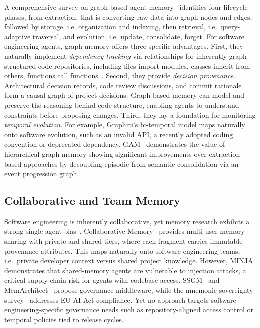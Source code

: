 \documentclass[runningheads]{llncs}
\begin{document}
A comprehensive survey on graph-based agent memory~\cite{graphmemsurvey2026}
identifies four lifecycle phases, from extraction, that is converting raw data into graph nodes and edges, followed by
storage, i.e. organization and indexing, then retrieval, i.e.\ query-adaptive traversal,
and evolution, i.e. update, consolidate, forget. For software engineering agents, graph memory
offers three specific advantages. First, they naturally implement \emph{dependency tracking} via relationships for inherently graph-structured code
repositories, including files import modules,
classes inherit from others, functions call functions~\cite{codebasemem2026}. Second, they provide \emph{decision provenance}. Architectural decision
records, code review discussions, and commit rationale form a causal
graph of project decisions. Graph-based memory can model and preserve the
reasoning behind code structure, enabling agents to understand
constraints before proposing changes. Third, they lay a foundation for monitoring \emph{temporal evolution}.
For example, Graphiti's bi-temporal model maps naturally onto software evolution, such as an
invalid API, a recently adopted coding convention or deprecated dependency. GAM~\cite{gam2026} demonstrates the value of hierarchical graph
memory showing significant improvements over extraction-based
approaches by decoupling episodic from semantic consolidation via an
event progression graph. 

\subsection{Collaborative and Team Memory}\label{sec:collaborative}

Software engineering is inherently collaborative, yet memory research
exhibits a strong single-agent bias~\cite{memagents2026}. Collaborative Memory~\cite{rezazadeh2025} provides multi-user memory sharing with private and shared tiers, where each fragment carries immutable provenance attributes. This maps naturally onto software engineering teams, i.e.\ private developer context versus shared project knowledge. However, MINJA~\cite{minja2026} demonstrates that shared-memory agents are vulnerable to injection attacks, a critical supply-chain risk for agents with codebase access. SSGM~\cite{ssgm2026} and MemArchitect~\cite{memarchitect2026} propose governance middleware, while the mnemonic sovereignty survey~\cite{mnemonic2026}
addresses EU AI Act compliance. Yet no approach targets software engineering-specific governance
needs such as repository-aligned access control or temporal policies tied
to release cycles.
\end{document}
